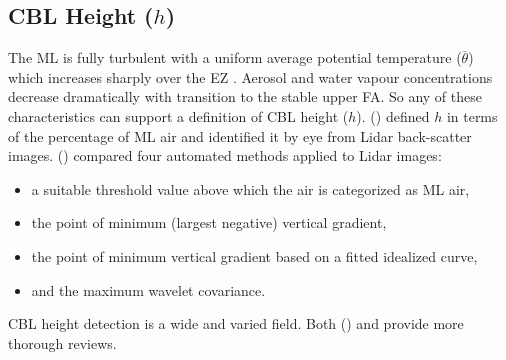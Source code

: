 \subsection{CBL Height ($h$)}
\label{subsec:cblh}

The \acs{ML} is fully turbulent with a uniform average potential temperature ($\overline{\theta}$) which increases sharply over the \acs{EZ} . Aerosol and water vapour concentrations decrease dramatically with transition to the stable upper \acs{FA}.  So any of these characteristics can support a definition of \acs{CBL} height ($h$).  \citeauthor{StullNelEl} (\citeyear{StullNelEl}) defined $h$ in terms of the percentage of \acs{ML} air and identified it by eye from Lidar back-scatter images.  \citeauthor{Traum11} (\citeyear{Traum11}) compared four automated methods applied to Lidar images:
 
\begin{itemize}
\item{a suitable threshold value above which the air is categorized as \acs{ML} air,}  
\item{the point of minimum (largest negative) vertical gradient,}
\item{the point of minimum vertical gradient based on a fitted idealized curve,}
 \item{and the maximum wavelet covariance.}  
\end{itemize}

\acs{CBL} height detection is a wide and varied field.  Both \citeauthor{BrooksFowler2} (\citeyear{BrooksFowler2}) and \citeauthor{Traum11} \citeyear{Traum11} provide more thorough reviews.\\

